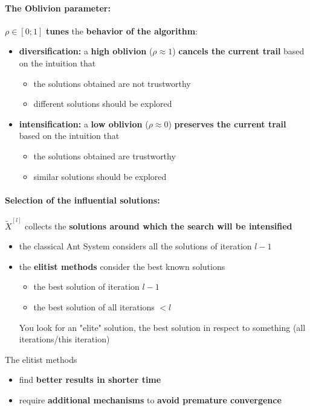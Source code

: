 \paragraph{The Oblivion parameter:} $\rho \in [0; 1]$ \textbf{tunes} the \textbf{behavior of the algorithm}:
\begin{itemize}
	\item \textbf{diversification:} a \textbf{high oblivion} ($\rho \approx 1$) \textbf{cancels the current trail} based on the intuition that
	\begin{itemize}
		\item the solutions obtained are not trustworthy
		\item different solutions should be explored
	\end{itemize}
	
	\item \textbf{intensification:} a \textbf{low oblivion} ($\rho \approx 0$) \textbf{preserves the current trail} based on the intuition that
	\begin{itemize}
		\item the solutions obtained are trustworthy
		\item similar solutions should be explored
	\end{itemize}
\end{itemize}
\nn

\paragraph{Selection of the influential solutions:} $\tilde{X}^{[l]}$ collects the \textbf{solutions around which the search will be intensified}
\begin{itemize}
	\item the classical Ant System considers all the solutions of iteration $l - 1$
	
	\item the \textbf{elitist methods} consider the best known solutions
	\begin{itemize}
		\item the best solution of iteration $l - 1$
		\item the best solution of all iterations $< l$
	\end{itemize}
	You look for an "elite" solution, the best solution in respect to something (all iterations/this iteration)
\end{itemize}

The elitist methods
\begin{itemize}
	\item find \textbf{better results in shorter time}
	
	\item require \textbf{additional mechanisms} to \textbf{avoid premature convergence}
\end{itemize}
\nn

